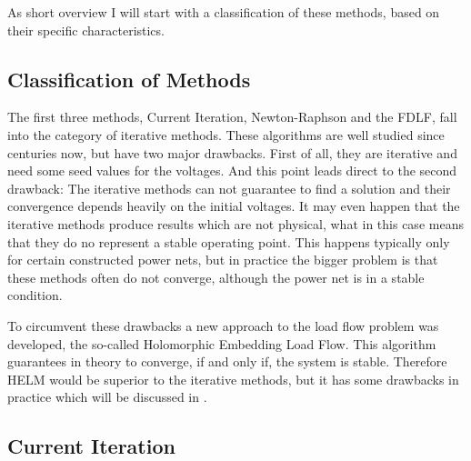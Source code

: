 As short overview I will start with a classification of these methods, based on their specific characteristics.

\subsection{Classification of Methods}

The first three methods, Current Iteration, Newton-Raphson and the FDLF, fall into the category of iterative methods. These algorithms are well studied since centuries now, but have two major drawbacks. First of all, they are iterative and need some seed values for the voltages. And this point leads direct to the second drawback: The iterative methods can not guarantee to find a solution and their convergence depends heavily on the initial voltages. It may even happen that the iterative methods produce results which are not physical, what in this case means that they do no represent a stable operating point. This happens typically only for certain constructed power nets, but in practice the bigger problem is that these methods often do not converge, although the power net is in a stable condition.

To circumvent these drawbacks a new approach to the load flow problem was developed, the so-called Holomorphic Embedding Load Flow. This algorithm guarantees in theory to converge, if and only if, the system is stable. Therefore HELM would be superior to the iterative methods, but it has some drawbacks in practice which will be discussed in . 

\subsection{Current Iteration}
\label{sec:current_iteration}

